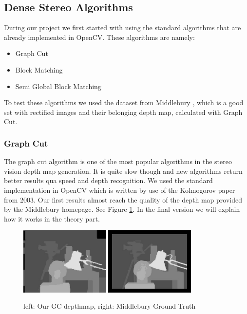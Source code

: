 \documentclass[a4paper]{article}
\begin{document}
\subsection{Dense Stereo Algorithms}
During our project we first started with using the standard algorithms
that are already implemented in OpenCV. These algorithms are namely:
\begin{itemize}
\item Graph Cut
\item Block Matching
\item Semi Global Block Matching
\end{itemize}
To test these algorithms we used the dataset from Middlebury
\cite{middlebury}, which is a good set with rectified images and their
belonging depth map, calculated with Graph Cut.

\subsubsection{Graph Cut}
The graph cut algorithm is one of the most popular algorithms in the
stereo vision depth map generation. It is quite slow though and new
algorithms return better results qua speed and depth recognition. We
used the standard implementation in OpenCV which is written by use of
the Kolmogorov paper from 2003\cite{kolmogorov2003}. Our first results
almost reach the quality of the depth map provided by the Middlebury
homepage\cite{middlebury}. See Figure \ref{gc_comp}. In the final
version we will explain how it works in the theory part. %

\begin{figure} [h!tb]
  \centering
  \includegraphics[width=0.4\textwidth]{gc_tsukuba_own}
  \includegraphics[width=0.4\textwidth]{disp_tsukuba_orig}
  \caption{left: Our GC depthmap, right: Middlebury Ground Truth}
  \label{gc_comp}
\end{figure}
\end{document}
